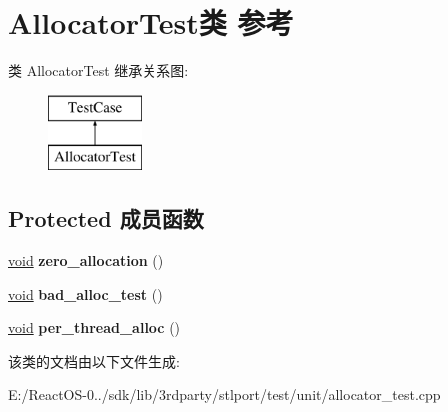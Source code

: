 \hypertarget{class_allocator_test}{}\section{Allocator\+Test类 参考}
\label{class_allocator_test}
类 Allocator\+Test 继承关系图\+:\begin{figure}[H]
\begin{center}
\leavevmode
\includegraphics[height=2.000000cm]{class_allocator_test}
\end{center}
\end{figure}
\subsection*{Protected 成员函数}
\begin{DoxyCompactItemize}
\item 
\mbox{\label{class_allocator_test_ae8f660adc82ed6a19ce146ffa4e5503e}} 
\hyperlink{interfacevoid}{void} {\bfseries zero\+\_\+allocation} ()
\item 
\mbox{\label{class_allocator_test_aa0322f0e9e2ca6b6a7a5c7a9d7443b9f}} 
\hyperlink{interfacevoid}{void} {\bfseries bad\+\_\+alloc\+\_\+test} ()
\item 
\mbox{\label{class_allocator_test_a3008b6eedb01048d79ec0af81433a853}} 
\hyperlink{interfacevoid}{void} {\bfseries per\+\_\+thread\+\_\+alloc} ()
\end{DoxyCompactItemize}


该类的文档由以下文件生成\+:\begin{DoxyCompactItemize}
\item 
E\+:/\+React\+O\+S-\/0../sdk/lib/3rdparty/stlport/test/unit/allocator\+\_\+test.\+cpp\end{DoxyCompactItemize}
